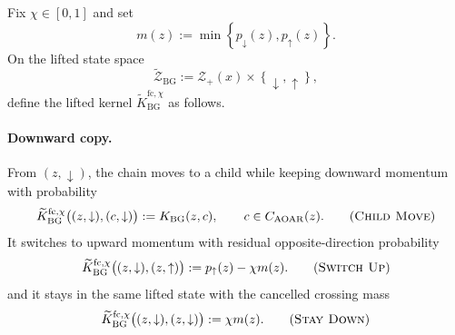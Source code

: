\documentclass{article}
\numberwithin{theorem}{section}
\numberwithin{proposition}{section}
\numberwithin{corollary}{section}
\numberwithin{lemma}{section}
\numberwithin{conjecture}{section}
\numberwithin{remark}{section}
\numberwithin{definition}{section}
\numberwithin{assumption}{section}
\numberwithin{example}{section}
\newcommand{\calZ}{{\mathcal{Z}}}
\newcommand{\mbra}[1]{\left\{#1\right\}}
\begin{document}
\begin{definition}
\label{def:bg_aoar_momentum_kernel}
Fix $\chi\in[0,1]$ and set
\begin{equation*}
    m(z):=\min\mbra{p_{\downarrow}(z),p_{\uparrow}(z)}.
\end{equation*}
On the lifted state space
\begin{equation*}
    \widetilde{\calZ}_{\mathrm{BG}}:=\calZ_+(x)\times\mbra{\downarrow,\uparrow},
\end{equation*}
define the lifted kernel $\widetilde K_{\mathrm{BG}}^{\mathrm{fc},\chi}$ as follows.

\paragraph{Downward copy.}
From $(z,\downarrow)$, the chain moves to a child while keeping downward momentum with probability
\begin{equation*}
    \widetilde K_{\mathrm{BG}}^{\mathrm{fc},\chi}
    \bigl((z,\downarrow),(c,\downarrow)\bigr)
    :=
    K_{\mathrm{BG}}(z,c),\qquad c\in C_{\mathrm{AOAR}}(z).
    \tag{\textsc{Child Move}}
\end{equation*}
It switches to upward momentum with residual opposite-direction probability
\begin{equation*}
    \widetilde K_{\mathrm{BG}}^{\mathrm{fc},\chi}
    \bigl((z,\downarrow),(z,\uparrow)\bigr)
    :=
    p_{\uparrow}(z)-\chi m(z).
    \tag{\textsc{Switch Up}}
\end{equation*}
and it stays in the same lifted state with the cancelled crossing mass
\begin{equation*}
    \widetilde K_{\mathrm{BG}}^{\mathrm{fc},\chi}
    \bigl((z,\downarrow),(z,\downarrow)\bigr)
    :=
    \chi m(z).
    \tag{\textsc{Stay Down}}
\end{equation*}


\end{definition}
\end{document}
